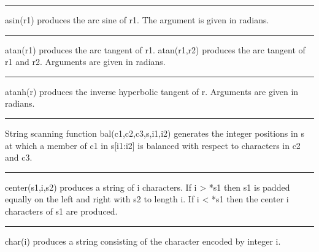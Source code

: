 \bigskip

\hrule\vspace{0.1cm}

\noindent
{}\textsf{asin(r1)} produces the arc sine of \textsf{r1}.
The argument is given in radians.

\bigskip

\hrule\vspace{0.1cm}

\noindent
{}\textsf{atan(r1)} produces the arc tangent of
\textsf{r1}. \textsf{atan(r1,r2)} produces the arc tangent of
\textsf{r1} and \textsf{r2}. Arguments are given in radians.

\bigskip\hrule\vspace{0.1cm}

\noindent
{}\textsf{atanh(r)} produces the inverse
hyperbolic tangent of \textsf{r}. Arguments are given in radians.

\bigskip\hrule\vspace{0.1cm}

\noindent
{}String scanning function
\textsf{bal(c1,c2,c3,s,i1,i2)} generates the integer positions in
\textsf{s} at which a member of \textsf{c1} in \textsf{s[i1:i2]} is
balanced with respect to characters in \textsf{c2} and \textsf{c3}.

\bigskip\hrule\vspace{0.1cm}

\noindent
{}\textsf{center(s1,i,s2)} produces a
string of \textsf{i} characters. If \textsf{i {\textgreater} *s1} then
\textsf{s1} is padded equally on the left and right with \textsf{s2} to
length \textsf{i}. If \textsf{i {\textless} *s1} then the center
\textsf{i} characters of \textsf{s1} are produced.

\bigskip\hrule\vspace{0.1cm}

\noindent
{}\textsf{char(i)} produces a string consisting of the
character encoded by integer \textsf{i}.

